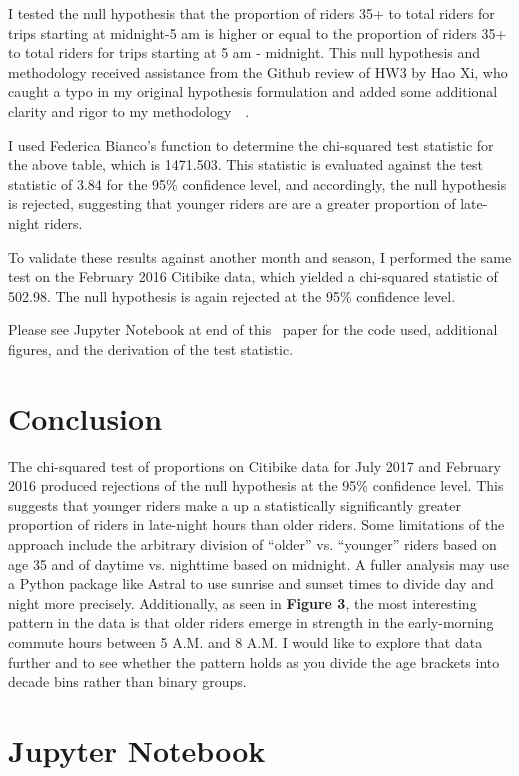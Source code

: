 \documentclass[10pt]{article}
\let\cite\citep
\providecommand\citep{\cite}
\begin{document}
I tested the null hypothesis that the proportion of riders 35+ to total
riders for trips starting at midnight-5 am is higher or equal to the
proportion of riders 35+ to total riders for trips starting at 5 am -
midnight. This null hypothesis and methodology received assistance from
the Github review of HW3 by Hao Xi, who caught a typo in my original
hypothesis formulation and added some additional clarity and rigor to my
methodology~~\cite{hw3}.

I used Federica Bianco's function to determine the chi-squared test
statistic for the above table, which is 1471.503. This statistic is
evaluated against the test statistic of 3.84 for the 95\% confidence
level, and accordingly, the null hypothesis is rejected, suggesting that
younger riders are are a greater proportion of late-night riders.

To validate these results against another month and season, I performed
the same test on the February 2016 Citibike data, which yielded a
chi-squared statistic of 502.98. The null hypothesis is again rejected
at the 95\% confidence level.

Please see Jupyter Notebook at end of this~ paper for the code used,
additional figures, and the derivation of the test statistic.

\section*{Conclusion}

{\label{667858}}

The chi-squared test of proportions on Citibike data for July 2017 and
February 2016 produced rejections of the null hypothesis at the 95\%
confidence level. This suggests that younger riders make a up a
statistically significantly greater proportion of riders in late-night
hours than older riders. Some limitations of the approach include the
arbitrary division of ``older'' vs. ``younger'' riders based on age 35
and of daytime vs. nighttime based on midnight. A fuller analysis may
use a Python package like Astral to use sunrise and sunset times to
divide day and night more precisely. Additionally, as seen in
\textbf{Figure 3}, the most interesting pattern in the data is that
older riders emerge in strength in the early-morning commute hours
between 5 A.M. and 8 A.M. I would like to explore that data further and
to see whether the pattern holds as you divide the age brackets into
decade bins rather than binary groups.

\section*{Jupyter Notebook}
\end{document}
